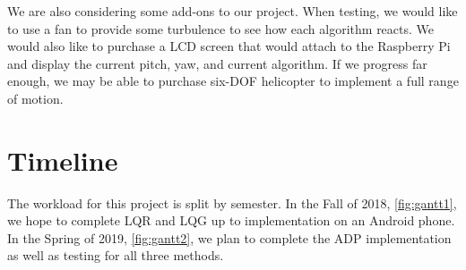 \documentclass[letterpaper, 10pt, conference]{ieeeconf}
\begin{document}
We are also considering some add-ons to our project.  When testing, we would like to use a fan to provide some turbulence to see how each algorithm reacts.  We would also like to purchase a LCD screen that would attach to the Raspberry Pi and display the current pitch, yaw, and current algorithm.  If we progress far enough, we may be able to purchase six-DOF helicopter to implement a full range of motion.



\section{Timeline} \label{sec:timeline}
The workload for this project is split by semester.  In the Fall of 2018, \autoref{fig:gantt1}, we hope to complete LQR and LQG up to implementation on an Android phone.  In the Spring of 2019, \autoref{fig:gantt2}, we plan to complete the ADP implementation as well as testing for all three methods.



\end{document}
